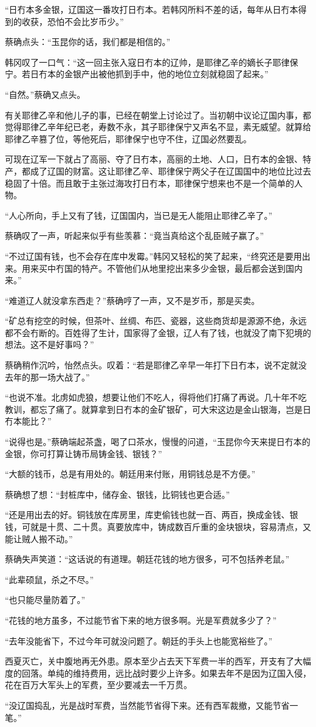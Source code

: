 “日冇本多金银，辽国这一番攻打日冇本。若韩冈所料不差的话，每年从日冇本得到的收获，恐怕不会比岁币少。”

蔡确点头：“玉昆你的话，我们都是相信的。”

韩冈叹了一口气：“这一回主张入寇日冇本的辽帅，是耶律乙辛的嫡长子耶律保宁。若日冇本的金银产出被他抓到手中，他的地位立刻就稳固了起来。”

“自然。”蔡确又点头。

有关耶律乙辛和他儿子的事，已经在朝堂上讨论过了。当初朝中议论辽国内事，都觉得耶律乙辛年纪已老，寿数不永，其子耶律保宁又声名不显，素无威望。就算给耶律乙辛篡了位，等他死后，耶律保宁也守不住，辽国必然要乱。

可现在辽军一下就占了高丽、夺了日冇本，高丽的土地、人口，日冇本的金银、特产，都成了辽国的财富。这让耶律乙辛、耶律保宁两父子在辽国国中的地位比过去稳固了十倍。而且敢于主张过海攻打日冇本，耶律保宁想来也不是一个简单的人物。

“人心所向，手上又有了钱，辽国国内，当已是无人能阻止耶律乙辛了。”

蔡确叹了一声，听起来似乎有些羡慕：“竟当真给这个乱臣贼子赢了。”

“不过辽国有钱，也不会存在库中发霉。”韩冈又轻松的笑了起来，“终究还是要用出来。用来买中冇国的特产。不管他们从地里挖出来多少金银，最后都会送到国内来。”

“难道辽人就没拿东西走？”蔡确哼了一声，又不是岁币，那是买卖。

“矿总有挖空的时候，但茶叶、丝绸、布匹、瓷器，这些商货却是源源不绝，永远都不会冇断的。百姓得了生计，国家得了金银，辽人有了钱，也就没了南下犯境的想法。这不是好事吗？”

蔡确稍作沉吟，怡然点头。叹着：“若是耶律乙辛早一年打下日冇本，说不定就没去年的那一场大战了。”

“也说不准。北虏如虎狼，想要让他们不吃人，得将他们打痛了再说。几十年不吃教训，都忘了痛了。就算拿到日冇本的金矿银矿，可大宋这边是金山银海，岂是日冇本能比？”

“说得也是。”蔡确端起茶盏，喝了口茶水，慢慢的问道，“玉昆你今天来提日冇本的金银，你可打算让铸币局铸金钱、银钱？”

“大额的钱币，总是有用处的。朝廷用来付账，用铜钱总是不方便。”

蔡确想了想：“封桩库中，储存金、银钱，比铜钱也更合适。”

“还是用出去的好。铜钱放在库房里，库吏偷钱也就一百、两百，换成金钱、银钱，可就是十贯、二十贯。真要放库中，铸成数百斤重的金块银块，容易清点，又能让贼人搬不动。”

蔡确失声笑道：“这话说的有道理。朝廷花钱的地方很多，可不包括养老鼠。”

“此辈硕鼠，杀之不尽。”

“也只能尽量防着了。”

“花钱的地方虽多，不过能节省下来的地方很多啊。光是军费就多少了？”

“去年没能省下，不过今年可就没问题了。朝廷的手头上也能宽裕些了。”

西夏灭亡，关中腹地再无外患。原本至少占去天下军费一半的西军，开支有了大幅度的回落。单纯的维持费用，远比战时要少上许多。如果去年不是因为辽国入侵，花在百万大军头上的军费，至少要减去一千万贯。

“没辽国捣乱，光是战时军费，当然能节省得下来。还有西军裁撤，又能节省一笔。”

